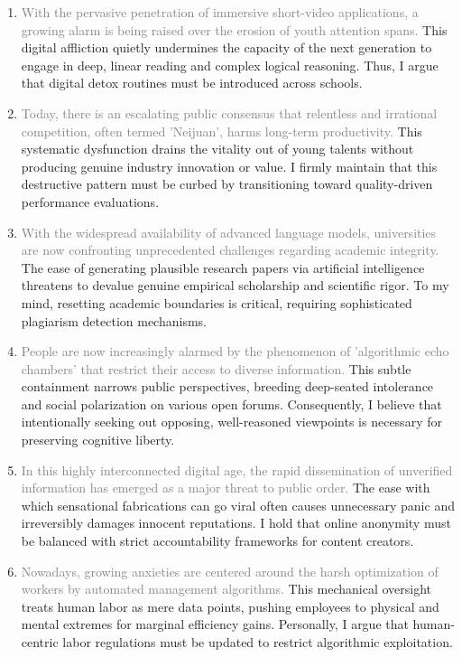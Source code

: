﻿\documentclass[lang=cn,11pt]{elegantbook}
\begin{document}
\begin{enumerate}
    \item \textcolor{gray}{With the pervasive penetration of immersive short-video applications, a growing alarm is being raised over the erosion of youth attention spans.} This digital affliction quietly undermines the capacity of the next generation to engage in deep, linear reading and complex logical reasoning. Thus, I argue that digital detox routines must be introduced across schools.
    \item \textcolor{gray}{Today, there is an escalating public consensus that relentless and irrational competition, often termed 'Neijuan', harms long-term productivity.} This systematic dysfunction drains the vitality out of young talents without producing genuine industry innovation or value. I firmly maintain that this destructive pattern must be curbed by transitioning toward quality-driven performance evaluations.
    \item \textcolor{gray}{With the widespread availability of advanced language models, universities are now confronting unprecedented challenges regarding academic integrity.} The ease of generating plausible research papers via artificial intelligence threatens to devalue genuine empirical scholarship and scientific rigor. To my mind, resetting academic boundaries is critical, requiring sophisticated plagiarism detection mechanisms.
    \item \textcolor{gray}{People are now increasingly alarmed by the phenomenon of 'algorithmic echo chambers' that restrict their access to diverse information.} This subtle containment narrows public perspectives, breeding deep-seated intolerance and social polarization on various open forums. Consequently, I believe that intentionally seeking out opposing, well-reasoned viewpoints is necessary for preserving cognitive liberty.
    \item \textcolor{gray}{In this highly interconnected digital age, the rapid dissemination of unverified information has emerged as a major threat to public order.} The ease with which sensational fabrications can go viral often causes unnecessary panic and irreversibly damages innocent reputations. I hold that online anonymity must be balanced with strict accountability frameworks for content creators.
    \item \textcolor{gray}{Nowadays, growing anxieties are centered around the harsh optimization of workers by automated management algorithms.} This mechanical oversight treats human labor as mere data points, pushing employees to physical and mental extremes for marginal efficiency gains. Personally, I argue that human-centric labor regulations must be updated to restrict algorithmic exploitation.

\end{enumerate}
\end{document}

